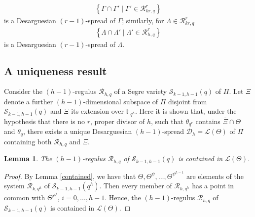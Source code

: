 \documentclass[11pt]{article}
\newtheorem{lemma}[theorem]{Lemma}
\theoremstyle{definition}
\numberwithin{equation}{section}
\def\cL{\mathcal L}
\def\cD{\mathcal D}
\def\cR{\mathcal R}
\def\cS{\mathcal S}
\def\F{{\mathbb F}}
\begin{document}
\begin{align*}
\left\{\Gamma \cap \Gamma' \mid \Gamma' \in \cR^r_{kr, q}\right\}
\end{align*}
is a Desarguesian $(r-1)$-spread of $\Gamma$; similarly, for $\Lambda \in \cR^r_{kr, q}$
\begin{align*}
\left\{\Lambda \cap \Lambda' \mid \Lambda' \in \cR^r_{h, q}\right\}
\end{align*}
is a Desarguesian $(r-1)$-spread of $\Lambda$.

\subsection{A uniqueness result}\label{sec:unique}

Consider the $(h-1)$-regulus $\cR_{h, q}$ of a Segre variety $\cS_{k-1, h-1}(q)$ of $\Pi$. Let $\Xi$ denote a further $(h-1)$-dimensional subspace of $\Pi$ disjoint from $\cS_{k-1, h-1}(q)$ and $\overline{\Xi}$ its extension over $\F_{q^h}$. Here it is shown that, under the hypothesis that there is no $r$, proper divisor of $h$, such that $\theta_{q^r}$ contains $\overline{\Xi} \cap \Theta$ and $\theta_q$, there exists a unique Desarguesian $(h-1)$-spread $\cD_h = \cL(\Theta)$ of $\Pi$ containing both $\cR_{h, q}$ and $\Xi$.

\begin{lemma}\label{crucial}
The $(h-1)$-regulus $\cR_{h, q}$ of $\cS_{k-1, h-1}(q)$ is contained in $\cL(\Theta)$.
\end{lemma}
\begin{proof}
By Lemma \ref{contained}, we have that $\Theta,\Theta^\psi, \ldots, \Theta^{\psi^{h-1}}$ are elements of the system $\cR_{k, q^h}$ of $\cS_{k-1, h-1}(q^h)$. Then every member of $\cR_{h, q^h}$ has a point in common with $\Theta^{\psi^i}$, $i = 0, \dots, h-1$. Hence, the $(h-1)$-regulus $\cR_{h, q}$ of $\cS_{k-1, h-1}(q)$ is contained in $\cL(\Theta)$. %
\end{proof}
\end{document}
